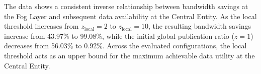 The data shows a consistent inverse relationship between bandwidth savings at the Fog Layer and subsequent data availability at the Central Entity. As the local threshold increases from $z_{\text{local}}=2$ to $z_{\text{local}}=10$, the resulting bandwidth savings increase from 43.97\% to 99.08\%, while the initial global publication ratio ($z=1$) decreases from 56.03\% to 0.92\%. Across the evaluated configurations, the local threshold acts as an upper bound for the maximum achievable data utility at the Central Entity.